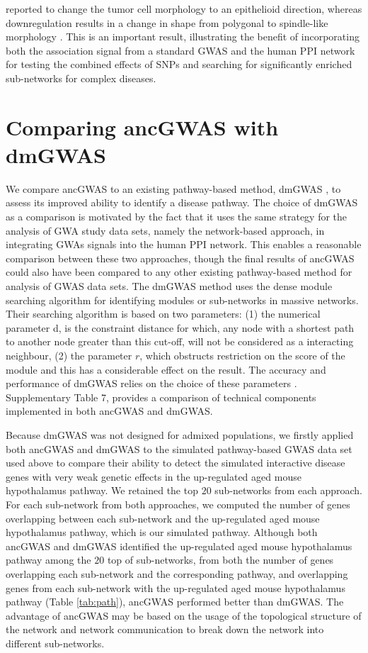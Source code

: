 \documentclass[10pt]{article}
\begin{document}
reported to change the tumor cell morphology to an epithelioid direction, whereas downregulation results in a change in shape from polygonal to spindle-like morphology \cite{breastc,breastd}. This is an important result, illustrating the benefit of incorporating both the association signal from a standard GWAS and the human PPI network for testing the combined effects of SNPs and searching for significantly enriched sub-networks for complex diseases.

\section*{Comparing ancGWAS with dmGWAS}

We compare ancGWAS to an existing pathway-based method, dmGWAS \cite{jia}, to assess its improved ability to identify a disease pathway. The choice of dmGWAS as a comparison is motivated by the fact that it uses the same strategy for the analysis of GWA study data sets, namely the network-based approach, in integrating GWAs signals into the human PPI network. This enables a reasonable comparison between these two approaches, though the final results of ancGWAS could also have been compared to any other existing pathway-based method for analysis of GWAS data sets. The dmGWAS method uses the dense module searching algorithm for identifying modules or sub-networks in massive networks. Their searching algorithm is based on two parameters: (1) the numerical parameter d, is the constraint distance for which, any node with a shortest path to another node greater than this cut-off, will not be considered as a interacting neighbour, (2) the parameter $r$, which obstructs restriction on the score of the module and this has a considerable effect on the result. The accuracy and performance of dmGWAS relies on the choice of these parameters \cite{jia}. Supplementary Table 7, provides a comparison of technical components implemented in both ancGWAS and dmGWAS.

Because dmGWAS was not designed for admixed populations, we firstly applied both ancGWAS and dmGWAS to the simulated pathway-based GWAS data set used above to compare their ability to detect the simulated interactive disease genes with very weak genetic effects in the up-regulated aged mouse hypothalamus pathway. We retained the top $20$ sub-networks from each approach. For each sub-network from both approaches, we computed the number of genes overlapping between each sub-network and the up-regulated aged mouse hypothalamus pathway, which is our simulated pathway. Although both ancGWAS and dmGWAS identified the up-regulated aged mouse hypothalamus pathway among the $20$ top of sub-networks, from both the number of genes overlapping each sub-network and the corresponding pathway, and  overlapping genes from each sub-network with the up-regulated aged mouse hypothalamus pathway (Table \ref{tab:path}), ancGWAS performed better than dmGWAS. The advantage of ancGWAS may be based on the usage of the topological structure of the network and network communication to break down the network into different sub-networks.
\end{document}
